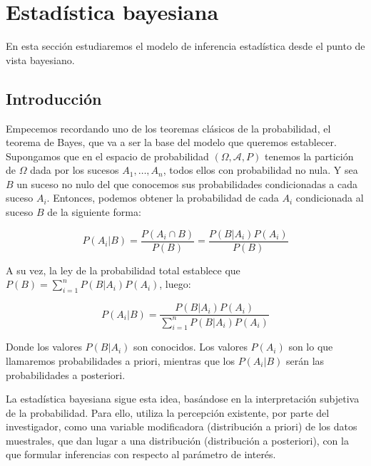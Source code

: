 \documentclass{article}
\begin{document}
\section{Estadística bayesiana}

En esta sección estudiaremos el modelo de inferencia estadística desde el punto de vista bayesiano.

\subsection{Introducción}

Empecemos recordando uno de los teoremas clásicos de la probabilidad, el teorema de Bayes, que va a ser la base del modelo que queremos establecer. Supongamos que en el espacio de probabilidad $(\Omega,\mathcal{A},P)$ tenemos la partición de $\Omega$ dada por los sucesos $A_1,\dots,A_n$, todos ellos con probabilidad no nula. Y sea $B$ un suceso no nulo del que conocemos sus probabilidades condicionadas a cada suceso $A_i$. Entonces, podemos obtener la probabilidad de cada $A_i$ condicionada al suceso $B$ de la siguiente forma:

\begin{equation*}
	P(A_i|B)=\frac{P(A_i\cap B)}{P(B)}=\frac{P(B|A_i)P(A_i)}{P(B)}
\end{equation*}

A su vez, la ley de la probabilidad total establece que $P(B)=\sum_{i=1}^n{P(B|A_i)P(A_i)}$, luego:

\begin{equation*}
	P(A_i|B)=\frac{P(B|A_i)P(A_i)}{\sum_{i=1}^n{P(B|A_i)P(A_i)}}
\end{equation*}

Donde los valores $P(B|A_i)$ son conocidos. Los valores $P(A_i)$ son lo que llamaremos probabilidades a priori, mientras que los $P(A_i|B)$ serán las probabilidades a posteriori.

La estadística bayesiana sigue esta idea, basándose en la interpretación subjetiva de la probabilidad. Para ello, utiliza la percepción existente, por parte del investigador, como una variable modificadora (distribución a priori) de los datos muestrales, que dan lugar a una distribución (distribución a posteriori), con la que formular inferencias con respecto al parámetro de interés.
\end{document}

